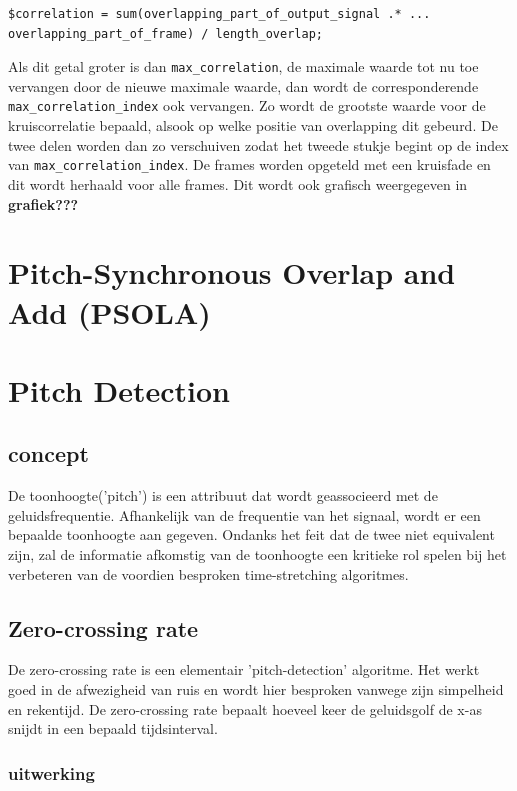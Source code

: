 \documentclass[12pt]{report}
\begin{document}
\begin{verbatim}
$correlation = sum(overlapping_part_of_output_signal .* ...
overlapping_part_of_frame) / length_overlap;
\end{verbatim}

Als dit getal groter is dan \verb|max_correlation|, de maximale waarde tot nu toe  vervangen door de nieuwe maximale waarde, dan wordt de corresponderende \verb|max_correlation_index| ook vervangen.
Zo wordt de grootste waarde voor de kruiscorrelatie bepaald, alsook op welke positie van overlapping dit gebeurd. De twee delen worden dan zo verschuiven zodat het tweede stukje begint op de index van \verb|max_correlation_index|. De frames worden opgeteld met een kruisfade en dit wordt herhaald voor alle frames. Dit wordt ook grafisch weergegeven in \textbf{grafiek???}

\section{Pitch-Synchronous Overlap and Add (PSOLA)}

\section{Pitch Detection} 

\subsection{concept}

De toonhoogte('pitch') is een attribuut dat wordt geassocieerd met de geluidsfrequentie. Afhankelijk van de frequentie van het signaal, wordt er een bepaalde toonhoogte aan gegeven. Ondanks het feit dat de twee niet equivalent zijn, zal de informatie afkomstig van de toonhoogte een kritieke rol spelen bij het 
verbeteren van de voordien besproken time-stretching algoritmes.

\subsection{Zero-crossing rate}

De zero-crossing rate is een elementair 'pitch-detection' algoritme. Het werkt goed in de afwezigheid van ruis en wordt hier besproken vanwege zijn simpelheid en rekentijd. De zero-crossing rate bepaalt hoeveel keer de geluidsgolf de x-as snijdt in een bepaald tijdsinterval.

\subsubsection{uitwerking}
\end{document}
